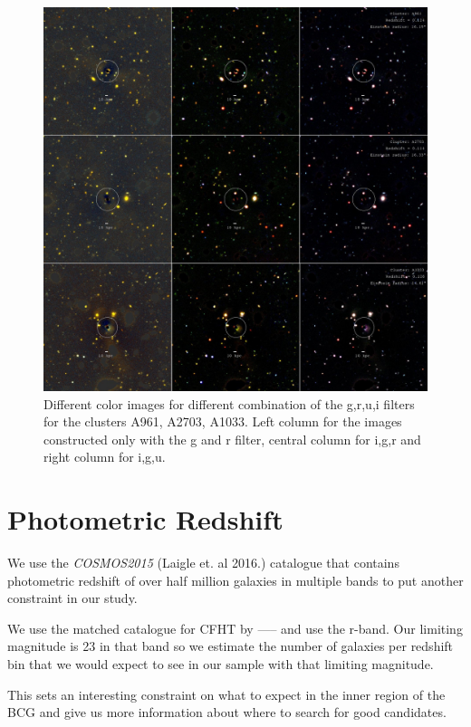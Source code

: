\begin{figure}[H]
\centering
\includegraphics[width=15cm]{images/full_real.jpg}
\caption[Color images for various clusters]{Different color images for different combination of the g,r,u,i filters for the clusters A961, A2703, A1033. Left column for the images constructed only with the g and r filter, central column for i,g,r and right column for i,g,u.}
\end{figure}

\section{Photometric Redshift}

We use the \textit{COSMOS2015} (Laigle et. al 2016.) catalogue that contains photometric redshift of over half million galaxies in multiple bands to put another constraint in our study.

We use the matched catalogue for CFHT by ----- and use the r-band. Our limiting magnitude is 23 in that band so we estimate the number of galaxies per redshift bin that we would expect to see in our sample with that limiting magnitude.

This sets an interesting constraint on what to expect in the inner region of the BCG and give us more information about where to search for good candidates.

